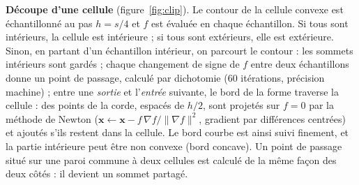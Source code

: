 \documentclass[10pt,a4paper]{article}
\newcommand{\vect}[1]{\boldsymbol{#1}}
\begin{document}
\textbf{Découpe d'une cellule} (figure~\ref{fig:clip}). Le contour de la cellule convexe est échantillonné au pas
$h=s/4$ et $f$ est évaluée en chaque échantillon. Si tous sont intérieurs, la cellule est intérieure ; si tous sont
extérieurs, elle est extérieure. Sinon, en partant d'un échantillon intérieur, on parcourt le contour : les sommets
intérieurs sont gardés ; chaque changement de signe de $f$ entre deux échantillons donne un point de passage,
calculé par dichotomie (60 itérations, précision machine) ; entre une \emph{sortie} et l'\emph{entrée} suivante,
le bord de la forme traverse la cellule : des points de la corde, espacés de $h/2$, sont projetés sur $f=0$ par
la méthode de Newton ($\vect x\leftarrow\vect x-f\,\nabla f/\|\nabla f\|^2$, gradient par différences centrées) et
ajoutés s'ils restent dans la cellule. Le bord courbe est ainsi suivi finement, et la partie intérieure peut être
non convexe (bord concave). Un point de passage situé sur une paroi commune à deux cellules est calculé de la même
façon des deux côtés : il devient un sommet partagé.
\end{document}
